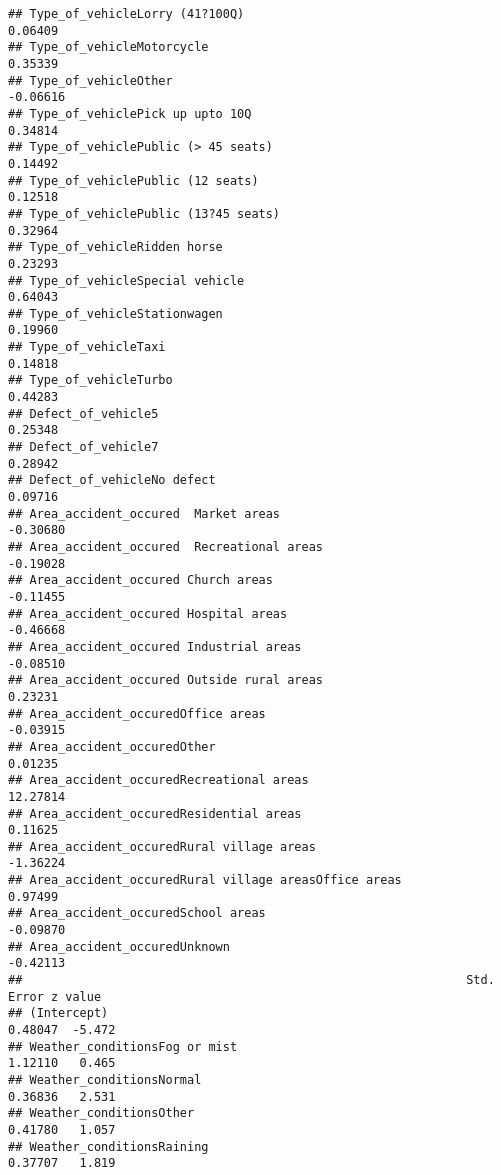 \documentclass[
]{article}
\begin{document}
\begin{verbatim}
## Type_of_vehicleLorry (41?100Q)                                 0.06409
## Type_of_vehicleMotorcycle                                      0.35339
## Type_of_vehicleOther                                          -0.06616
## Type_of_vehiclePick up upto 10Q                                0.34814
## Type_of_vehiclePublic (> 45 seats)                             0.14492
## Type_of_vehiclePublic (12 seats)                               0.12518
## Type_of_vehiclePublic (13?45 seats)                            0.32964
## Type_of_vehicleRidden horse                                    0.23293
## Type_of_vehicleSpecial vehicle                                 0.64043
## Type_of_vehicleStationwagen                                    0.19960
## Type_of_vehicleTaxi                                            0.14818
## Type_of_vehicleTurbo                                           0.44283
## Defect_of_vehicle5                                             0.25348
## Defect_of_vehicle7                                             0.28942
## Defect_of_vehicleNo defect                                     0.09716
## Area_accident_occured  Market areas                           -0.30680
## Area_accident_occured  Recreational areas                     -0.19028
## Area_accident_occured Church areas                            -0.11455
## Area_accident_occured Hospital areas                          -0.46668
## Area_accident_occured Industrial areas                        -0.08510
## Area_accident_occured Outside rural areas                      0.23231
## Area_accident_occuredOffice areas                             -0.03915
## Area_accident_occuredOther                                     0.01235
## Area_accident_occuredRecreational areas                       12.27814
## Area_accident_occuredResidential areas                         0.11625
## Area_accident_occuredRural village areas                      -1.36224
## Area_accident_occuredRural village areasOffice areas           0.97499
## Area_accident_occuredSchool areas                             -0.09870
## Area_accident_occuredUnknown                                  -0.42113
##                                                              Std. Error z value
## (Intercept)                                                     0.48047  -5.472
## Weather_conditionsFog or mist                                   1.12110   0.465
## Weather_conditionsNormal                                        0.36836   2.531
## Weather_conditionsOther                                         0.41780   1.057
## Weather_conditionsRaining                                       0.37707   1.819

\end{verbatim}
\end{document}

